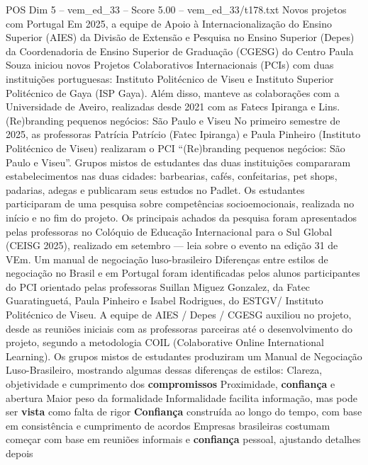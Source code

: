 \begin{textsample}{POS Dim 5 – vem\_ed\_33 – Score 5.00 – vem\_ed\_33/t178.txt}  \label{ex:f5_pos_099}
Novos projetos com Portugal Em 2025, a equipe de Apoio à Internacionalização do Ensino Superior (AIES) da Divisão de Extensão e Pesquisa no Ensino Superior (Depes) da Coordenadoria de Ensino Superior de Graduação (CGESG) do Centro Paula Souza iniciou novos Projetos Colaborativos Internacionais (PCIs) com duas instituições portuguesas: Instituto Politécnico de Viseu e Instituto Superior Politécnico de Gaya (ISP Gaya).
Além disso, manteve as colaborações com a Universidade de Aveiro, realizadas desde 2021 com as Fatecs Ipiranga e Lins. (Re)branding pequenos negócios: São Paulo e Viseu No primeiro semestre de 2025, as professoras Patrícia Patrício (Fatec Ipiranga) e Paula Pinheiro (Instituto Politécnico de Viseu) realizaram o PCI “(Re)branding pequenos negócios: São Paulo e Viseu”.
Grupos mistos de estudantes das duas instituições compararam estabelecimentos nas duas cidades: barbearias, cafés, confeitarias, pet shops, padarias, adegas e publicaram seus estudos no Padlet.
Os estudantes participaram de uma pesquisa sobre competências socioemocionais, realizada no início e no fim do projeto.
Os principais achados da pesquisa foram apresentados pelas professoras no Colóquio de Educação Internacional para o Sul Global (CEISG 2025), realizado em setembro — leia sobre o evento na edição 31 de VEm.
Um manual de negociação luso-brasileiro Diferenças entre estilos de negociação no Brasil e em Portugal foram identificadas pelos alunos participantes do PCI orientado pelas professoras Suillan Miguez Gonzalez, da Fatec Guaratinguetá, Paula Pinheiro e Isabel Rodrigues, do ESTGV/ Instituto Politécnico de Viseu.
A equipe de AIES / Depes / CGESG auxiliou no projeto, desde as reuniões iniciais com as professoras parceiras até o desenvolvimento do projeto, segundo a metodologia COIL (Colaborative Online International Learning).
Os grupos mistos de estudantes produziram um Manual de Negociação Luso-Brasileiro, mostrando algumas dessas diferenças de estilos: Clareza, objetividade e cumprimento dos \textbf{compromissos} Proximidade, \textbf{confiança} e abertura Maior peso da formalidade Informalidade facilita informação, mas pode ser \textbf{vista} como falta de rigor \textbf{Confiança} construída ao longo do tempo, com base em consistência e cumprimento de acordos Empresas brasileiras costumam começar com base em reuniões informais e \textbf{confiança} pessoal, ajustando detalhes depois

\end{textsample}
